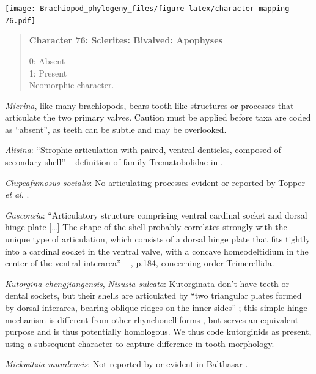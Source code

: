 \documentclass[openany]{book}
\begin{document}
\texttt{[image: Brachiopod\_phylogeny\_files/figure-latex/character-mapping-76.pdf]}

\begin{quote}
\textbf{Character 76: Sclerites: Bivalved: Apophyses}

0: Absent\\
1: Present\\
Neomorphic character.
\end{quote}

\emph{Micrina}, like many brachiopods, bears tooth-like structures or
processes that articulate the two primary valves. Caution must be
applied before taxa are coded as ``absent'', as teeth can be subtle and
may be overlooked.

\hypertarget{Alisina-coding-76}{}
\emph{Alisina}: ``Strophic articulation with paired, ventral denticles,
composed of secondary shell'' -- definition of family Trematobolidae in
\citet{Williams2000LinguliformeaCraniiformea}.

\hypertarget{Clupeafumosus_socialis-coding-76}{}
\emph{Clupeafumosus socialis}: No articulating processes evident or
reported by Topper \emph{et al}. \citeyearpar{Topper2013Reappraisalof}.

\hypertarget{Gasconsia-coding-76}{}
\emph{Gasconsia}: ``Articulatory structure comprising ventral cardinal
socket and dorsal hinge plate {[}\ldots{}{]} The shape of the shell
probably correlates strongly with the unique type of articulation, which
consists of a dorsal hinge plate that fits tightly into a cardinal
socket in the ventral valve, with a concave homeodeltidium in the center
of the ventral interarea'' --
\citet{Williams2000LinguliformeaCraniiformea}, p.184, concerning order
Trimerellida.

\hypertarget{Kutorgina_chengjiangensis-coding-76}{}
\emph{Kutorgina chengjiangensis}, \emph{Nisusia sulcata}: Kutorginata
don't have teeth or dental sockets, but their shells are articulated by
``two triangular plates formed by dorsal interarea, bearing oblique
ridges on the inner sides''
\citep[p.~211]{Williams2000LinguliformeaCraniiformea}; this simple hinge
mechanism is different from other rhynchonelliforms
\citep[p.208]{Williams2000LinguliformeaCraniiformea}, but serves an
equivalent purpose and is thus potentially homologous. We thus code
kutorginids as present, using a subsequent character to capture
difference in tooth morphology.

\hypertarget{Mickwitzia_muralensis-coding-76}{}
\emph{Mickwitzia muralensis}: Not reported by or evident in Balthasar
\citeyearpar{Balthasar2004Shellstructure}.
\end{document}

